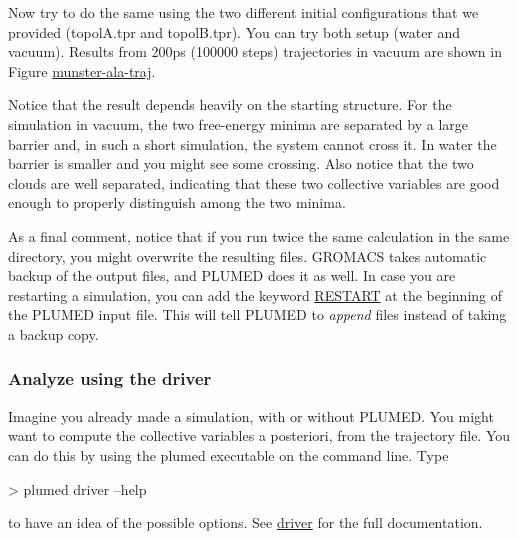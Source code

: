 Now try to do the same using the two different initial configurations that we provided ({\ttfamily topol\+A.\+tpr} and {\ttfamily topol\+B.\+tpr}). You can try both setup (water and vacuum). Results from 200ps (100000 steps) trajectories in vacuum are shown in Figure \hyperlink{munster_munster-ala-traj}{munster-\/ala-\/traj}.

\label{munster_munster-ala-traj}%
\hypertarget{munster_munster-ala-traj}{}%
 Notice that the result depends heavily on the starting structure. For the simulation in vacuum, the two free-\/energy minima are separated by a large barrier and, in such a short simulation, the system cannot cross it. In water the barrier is smaller and you might see some crossing. Also notice that the two clouds are well separated, indicating that these two collective variables are good enough to properly distinguish among the two minima.

As a final comment, notice that if you run twice the same calculation in the same directory, you might overwrite the resulting files. G\+R\+O\+M\+A\+C\+S takes automatic backup of the output files, and P\+L\+U\+M\+E\+D does it as well. In case you are restarting a simulation, you can add the keyword \hyperlink{RESTART}{R\+E\+S\+T\+A\+R\+T} at the beginning of the P\+L\+U\+M\+E\+D input file. This will tell P\+L\+U\+M\+E\+D to {\itshape append} files instead of taking a backup copy.

 \hypertarget{munster_munster-monitor-dr}{}\subsubsection{Analyze using the driver}\label{munster_munster-monitor-dr}
Imagine you already made a simulation, with or without P\+L\+U\+M\+E\+D. You might want to compute the collective variables a posteriori, from the trajectory file. You can do this by using the plumed executable on the command line. Type \begin{DoxyVerb}> plumed driver --help
\end{DoxyVerb}
 to have an idea of the possible options. See \hyperlink{driver}{driver} for the full documentation.

